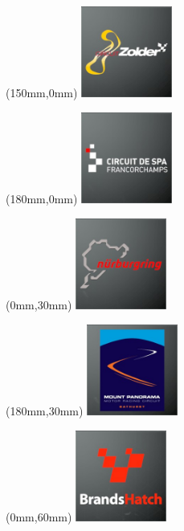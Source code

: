 \begin{textblock*}{30mm}(150mm,0mm)%
\includegraphics[width=30mm]{LG/2015-05-20_00100.png}
\end{textblock*}
\begin{textblock*}{30mm}(180mm,0mm)%
\includegraphics[width=30mm]{LG/2015-05-20_00079.png}
\end{textblock*}
\begin{textblock*}{30mm}(0mm,30mm)%
\includegraphics[width=30mm]{LG/2015-05-20_00088.png}
\end{textblock*}
\begin{textblock*}{30mm}(180mm,30mm)%
\includegraphics[width=30mm]{LG/2015-05-20_00087.png}
\end{textblock*}
\begin{textblock*}{30mm}(0mm,60mm)%
\includegraphics[width=30mm]{LG/2015-05-20_00074.png}
\end{textblock*}
